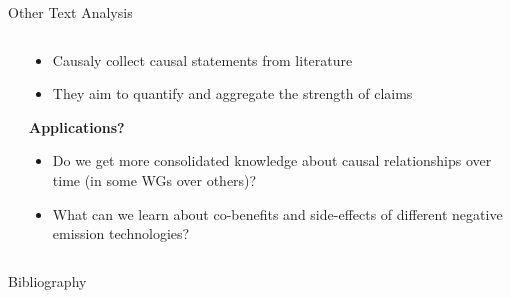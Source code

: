 \documentclass[9pt]{beamer}
\begin{document}
\begin{frame}{Other Text Analysis}

\begin{columns}
	\begin{column}{0.5\linewidth}
		\begin{center}
		\end{center}
	\end{column}
	\begin{column}{0.5\linewidth}
		\begin{center}
			\begin{itemize}
				\item Causaly collect causal statements from literature
				\item They aim to quantify and aggregate the strength of claims
				
			\end{itemize}
			\medskip
			\textbf{Applications?}
			\begin{itemize}
				\item Do we get more consolidated knowledge about causal relationships over time (in some WGs over others)?
				\item What can we learn about co-benefits and side-effects of different negative emission technologies?
				
				
			\end{itemize}
		\end{center}
	\end{column}
\end{columns}

\end{frame}



\begin{frame}{Bibliography}
\small
%

\end{frame}
\end{document}
